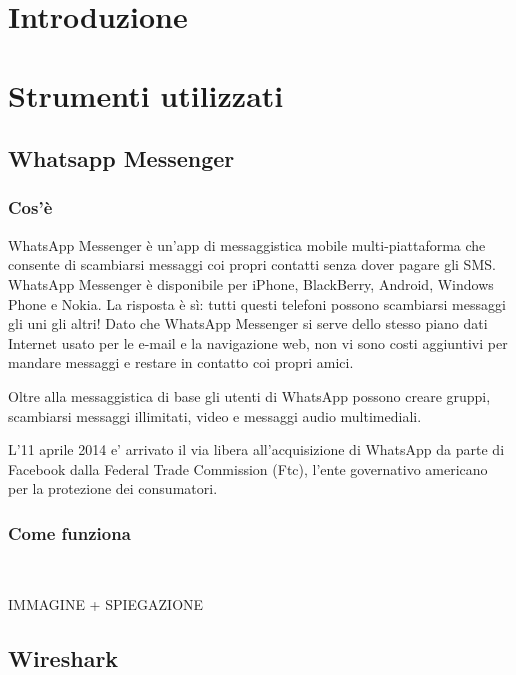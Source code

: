 \documentclass[a4paper,11pt]{book}
\begin{document}
\begin{frontespizio}
\end{frontespizio}


\tableofcontents

\chapter{Introduzione}


\chapter{Strumenti utilizzati}

\section{Whatsapp Messenger}
\subsection{Cos'è}
WhatsApp Messenger è un'app di messaggistica mobile multi-piattaforma che consente di scambiarsi messaggi coi propri contatti senza dover pagare gli SMS. WhatsApp Messenger è disponibile per iPhone, BlackBerry, Android, Windows Phone e Nokia. La risposta è sì: tutti questi telefoni possono scambiarsi messaggi gli uni gli altri! Dato che WhatsApp Messenger si serve dello stesso piano dati Internet usato per le e-mail e la navigazione web, non vi sono costi aggiuntivi per mandare messaggi e restare in contatto coi propri amici.

Oltre alla messaggistica di base gli utenti di WhatsApp possono creare gruppi, scambiarsi messaggi illimitati, video e messaggi audio multimediali.

L'11 aprile 2014 e' arrivato il via libera all'acquisizione di WhatsApp da parte di Facebook dalla Federal Trade Commission (Ftc), l'ente governativo americano per la protezione dei consumatori.
\subsection{Come funziona}


~


IMMAGINE + SPIEGAZIONE
\section{Wireshark}
\end{document}
